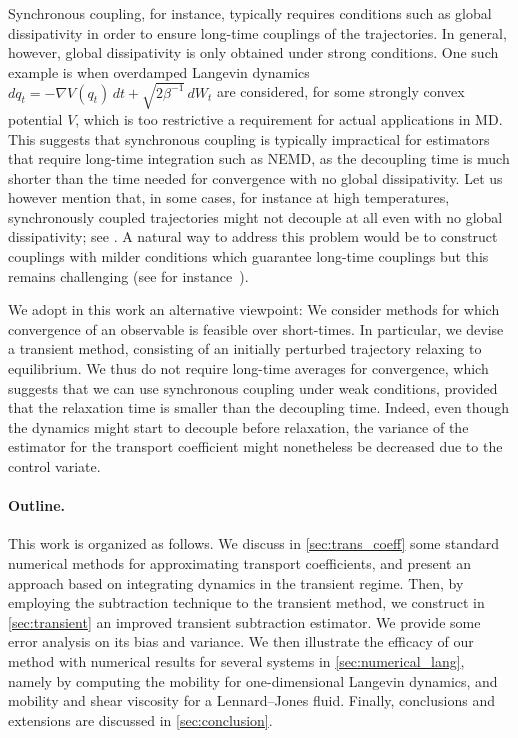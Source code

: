 \documentclass[11pt]{article}
\theoremstyle{definition}
\let\oldparagraph=\paragraph
\renewcommand\paragraph[1]{\oldparagraph{#1.}}
\begin{document}
Synchronous coupling, for instance, typically requires conditions such as global dissipativity in order to ensure long-time couplings of the trajectories. In general, however, global dissipativity is only obtained under strong conditions. One such example is when overdamped Langevin dynamics $dq_t = -\nabla V(q_t) \, dt + \sqrt{2\beta^{-1}} \, dW_t$ are considered, for some strongly convex potential $V$, which is too restrictive a requirement for actual applications in MD. This suggests that synchronous coupling is typically impractical for estimators that require long-time integration such as NEMD, as the decoupling time is much shorter than the time needed for convergence with no global dissipativity. Let us however mention that, in some cases, for instance at high temperatures, synchronously coupled trajectories might not decouple at all even with no global dissipativity; see \cite{monmarche2023}. A natural way to address this problem would be to construct couplings with milder conditions which guarantee long-time couplings but this remains challenging (see for instance~\cite{darshan2024}).

We adopt in this work an alternative viewpoint: We consider methods for which convergence of an observable is feasible over short-times. In particular, we devise a transient method, consisting of an initially perturbed trajectory relaxing to equilibrium. We thus do not require long-time averages for convergence, 
which suggests that we can use synchronous coupling under weak conditions, provided that the relaxation time is smaller than the decoupling time. Indeed, even though the dynamics might start to decouple before relaxation, the variance of the estimator for the transport coefficient might nonetheless be decreased due to the control variate.

\paragraph{Outline} This work is organized as follows. We discuss in \cref{sec:trans_coeff} some standard numerical methods for approximating transport coefficients, and present an approach based on integrating dynamics in the transient regime. Then, by employing the subtraction technique to the transient method, we construct in \cref{sec:transient} an improved transient subtraction estimator. We provide some error analysis on its bias and variance. We then illustrate the efficacy of our method with numerical results for several systems in \cref{sec:numerical_lang}, namely by computing the mobility for one-dimensional Langevin dynamics, and mobility and shear viscosity for a Lennard--Jones fluid. Finally, conclusions and extensions are discussed in \cref{sec:conclusion}.
\end{document}
